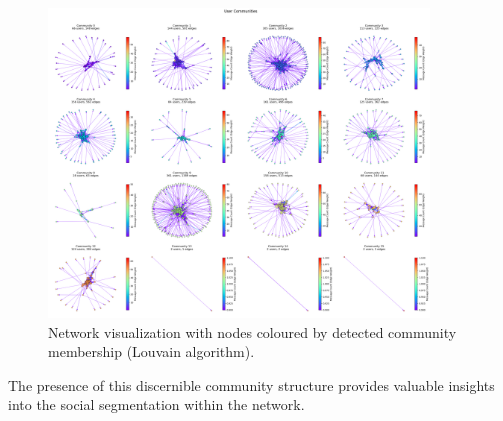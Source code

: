 \begin{figure}[h!]
    \centering
    \includegraphics[width=0.9\textwidth]{../communities.png}
    \caption{Network visualization with nodes coloured by detected community membership (Louvain algorithm).}
    \label{fig:community_visualization}
\end{figure}

The presence of this discernible community structure provides valuable insights into the social segmentation within the network.
